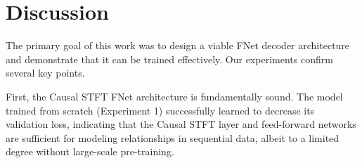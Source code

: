 \documentclass[11pt,a4paper]{article}
\begin{document}
\begin{table}[h]
\centering
\caption{Ablation study results, sorted by final validation loss.}
\label{tab:ablation_results}
\end{table}


\section{Discussion}
The primary goal of this work was to design a viable FNet decoder architecture and demonstrate that it can be trained effectively. Our experiments confirm several key points.

First, the Causal STFT FNet architecture is fundamentally sound. The model trained from scratch (Experiment 1) successfully learned to decrease its validation loss, indicating that the Causal STFT layer and feed-forward networks are sufficient for modeling relationships in sequential data, albeit to a limited degree without large-scale pre-training.
\end{document}
